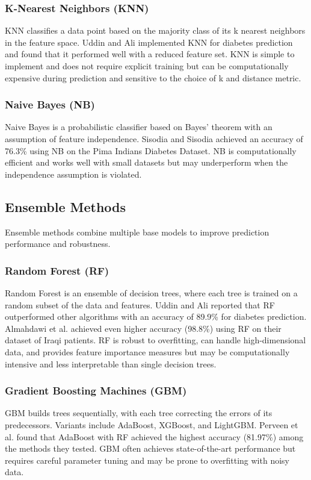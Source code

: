 \documentclass[journal]{IEEEtran}
\begin{document}
\subsubsection{K-Nearest Neighbors (KNN)}
KNN classifies a data point based on the majority class of its k nearest neighbors in the feature space. Uddin and Ali \cite{uddin2023} implemented KNN for diabetes prediction and found that it performed well with a reduced feature set. KNN is simple to implement and does not require explicit training but can be computationally expensive during prediction and sensitive to the choice of k and distance metric.

\subsubsection{Naive Bayes (NB)}
Naive Bayes is a probabilistic classifier based on Bayes' theorem with an assumption of feature independence. Sisodia and Sisodia \cite{sisodia2018} achieved an accuracy of 76.3\% using NB on the Pima Indians Diabetes Dataset. NB is computationally efficient and works well with small datasets but may underperform when the independence assumption is violated.

\subsection{Ensemble Methods}
Ensemble methods combine multiple base models to improve prediction performance and robustness.

\subsubsection{Random Forest (RF)}
Random Forest is an ensemble of decision trees, where each tree is trained on a random subset of the data and features. Uddin and Ali \cite{uddin2023} reported that RF outperformed other algorithms with an accuracy of 89.9\% for diabetes prediction. Almahdawi et al. \cite{almahdawi2023} achieved even higher accuracy (98.8\%) using RF on their dataset of Iraqi patients. RF is robust to overfitting, can handle high-dimensional data, and provides feature importance measures but may be computationally intensive and less interpretable than single decision trees.

\subsubsection{Gradient Boosting Machines (GBM)}
GBM builds trees sequentially, with each tree correcting the errors of its predecessors. Variants include AdaBoost, XGBoost, and LightGBM. Perveen et al. \cite{perveen2016} found that AdaBoost with RF achieved the highest accuracy (81.97\%) among the methods they tested. GBM often achieves state-of-the-art performance but requires careful parameter tuning and may be prone to overfitting with noisy data.
\end{document}
